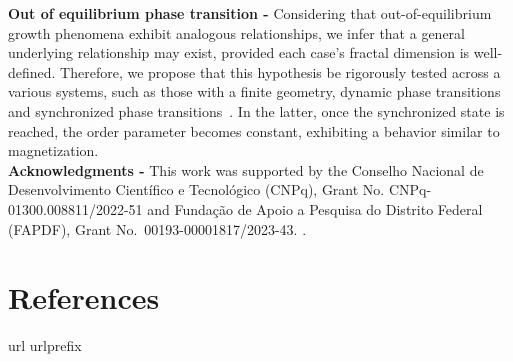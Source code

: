 \documentclass[pre,aps,twocolumn,showpacs,floatfix,nofootinbib,superscriptaddress,linenumbers]{revtex4-1}
\begin{document}
{\bf Out of equilibrium phase transition -} Considering that out-of-equilibrium growth phenomena exhibit analogous relationships, we infer that a general underlying relationship may exist, provided each case's fractal dimension is well-defined. Therefore, we propose that this hypothesis be rigorously tested across a various systems, such as those with a finite geometry\cite{GomesFilho20,Kalosakas22,salman24}, dynamic phase transitions~\cite{Ziff86,Fernandes18,Santos24} and synchronized phase transitions~\cite{Kuramoto84,Pinto16,Pinto17,Gutierrez24,GUTIERREZ25}. In the latter, once the synchronized state is reached, the order parameter becomes constant, exhibiting a behavior similar to magnetization\cite{Kuramoto84}.\\


{\bf Acknowledgments -} This work was supported by 
the Conselho Nacional de Desenvolvimento Cient\'{i}fico e Tecnol\'{o}gico (CNPq), Grant No.  CNPq-01300.008811/2022-51  and Funda\c{c}\~ao de Apoio a Pesquisa do Distrito Federal (FAPDF), Grant No.\ 00193-00001817/2023-43. . 

\vspace{1.0cm}

\section*{References} 
\vspace{0.5cm}

%


\providecommand{\newblock}{}
\expandafter\ifx\csname url\endcsname\relax
  \def\url#1{{\tt #1}}\fi
\expandafter\ifx\csname urlprefix\endcsname\relax\def\urlprefix{URL }\fi
\providecommand{\eprint}[2][]{\url{#2}}

\end{document}
